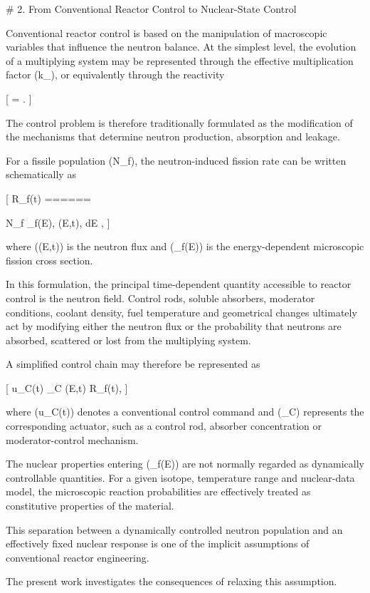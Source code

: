 # 2. From Conventional Reactor Control to Nuclear-State Control

Conventional reactor control is based on the manipulation of macroscopic variables that influence the neutron balance. At the simplest level, the evolution of a multiplying system may be represented through the effective multiplication factor (k_{}), or equivalently through the reactivity

[
\rho = .
]

The control problem is therefore traditionally formulated as the modification of the mechanisms that determine neutron production, absorption and leakage.

For a fissile population (N_f), the neutron-induced fission rate can be written schematically as

[
R_f(t)
======

N_f
\int
\sigma_f(E),
\Phi(E,t),
dE ,
]

where (\Phi(E,t)) is the neutron flux and (\sigma_f(E)) is the energy-dependent microscopic fission cross section.

In this formulation, the principal time-dependent quantity accessible to reactor control is the neutron field. Control rods, soluble absorbers, moderator conditions, coolant density, fuel temperature and geometrical changes ultimately act by modifying either the neutron flux or the probability that neutrons are absorbed, scattered or lost from the multiplying system.

A simplified control chain may therefore be represented as

[
u_C(t)
\longrightarrow
{}_C
\longrightarrow
\Phi(E,t)
\longrightarrow
R_f(t),
]

where (u_C(t)) denotes a conventional control command and (_C) represents the corresponding actuator, such as a control rod, absorber concentration or moderator-control mechanism.

The nuclear properties entering (\sigma_f(E)) are not normally regarded as dynamically controllable quantities. For a given isotope, temperature range and nuclear-data model, the microscopic reaction probabilities are effectively treated as constitutive properties of the material.

This separation between a dynamically controlled neutron population and an effectively fixed nuclear response is one of the implicit assumptions of conventional reactor engineering.

The present work investigates the consequences of relaxing this assumption.

